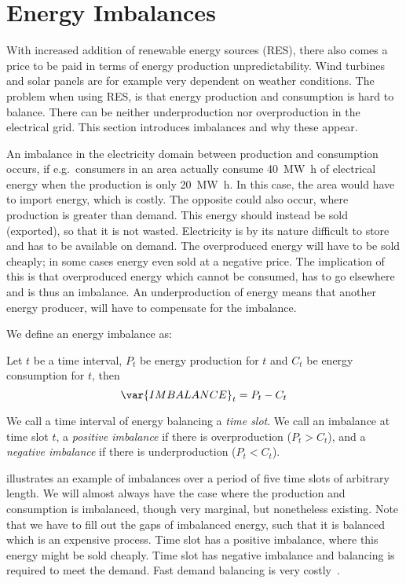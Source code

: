 \section{Energy Imbalances}\label{sec:energy_imbalances}
With increased addition of renewable energy sources (RES), there also comes a price to be paid in terms of energy production unpredictability. Wind turbines and solar panels are for example very dependent on weather conditions. The problem when using RES, is that energy production and consumption is hard to balance. There can be neither underproduction nor overproduction in the electrical grid. This section introduces imbalances and why these appear.

An imbalance in the electricity domain between production and consumption occurs, if e.g.\ consumers in an area actually consume \SI{40}{\MW\hour} of electrical energy when the production is only \SI{20}{\MW\hour}. In this case, the area would have to import energy, which is costly. The opposite could also occur, where production is greater than demand. This energy should instead be sold (exported), so that it is not wasted. Electricity is by its nature difficult to store and has to be available on demand. The overproduced energy will have to be sold cheaply; in some cases energy even sold at a negative price. The implication of this is that overproduced energy which cannot be consumed, has to go elsewhere and is thus an imbalance. An underproduction of energy means that another energy producer, will have to compensate for the imbalance. 

We define an energy imbalance as:

\begin{definition}[Imbalance]\label{def:imbalance}
	Let $t$ be a time interval, $P_t$ be energy production for $t$ and $C_t$ be energy consumption for $t$, then
  \[
    \var{IMBALANCE}_{t} = P_t - C_t
  \]
\end{definition}

We call a time interval of energy balancing a \emph{time slot}. We call an imbalance at time slot $t$, a \emph{positive imbalance} if there is overproduction ($P_t > C_t$), and a \emph{negative imbalance} if there is underproduction ($P_t < C_t$).

 illustrates an example of imbalances over a period of five time slots of arbitrary length. We will almost always have the case where the production and consumption is imbalanced, though very marginal, but nonetheless existing. Note that we have to fill out the gaps of imbalanced energy, such that it is balanced which is an expensive process. Time slot  has a positive imbalance, where this energy might be sold cheaply. Time slot  has negative imbalance and balancing is required to meet the demand. Fast demand balancing is very costly~\cite{BALANCEMARKET}.

